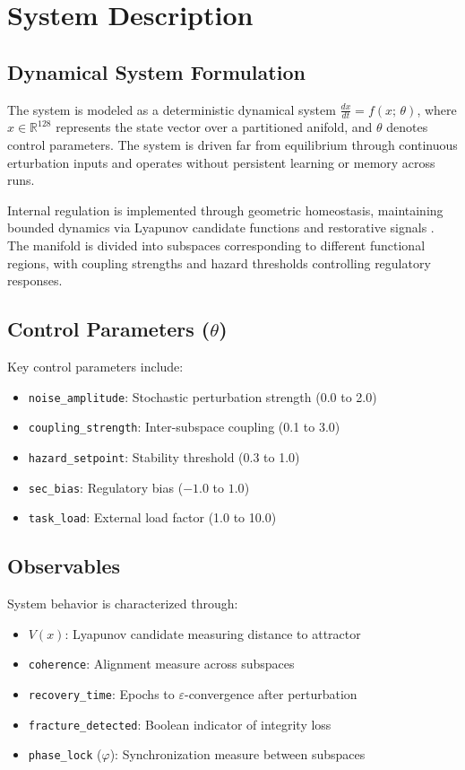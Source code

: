 \documentclass[12pt,a4paper]{article}
\begin{document}
\section{System Description}

\subsection{Dynamical System Formulation}

The system is modeled as a deterministic dynamical system $\frac{dx}{dt} = f(x;\,\theta)$, where $x \in \mathbb{R}^{128}$ represents the state vector over a partitioned anifold, and $\theta$ denotes control parameters. The system is driven far from equilibrium through continuous erturbation inputs and operates without persistent learning or memory across runs.


Internal regulation is implemented through geometric homeostasis, maintaining bounded dynamics via Lyapunov candidate functions and restorative signals \cite{khalil2002nonlinear}. The manifold is divided into subspaces corresponding to different functional regions, with coupling strengths and hazard thresholds controlling regulatory responses.

\subsection{Control Parameters ($\theta$)}

Key control parameters include:
\begin{itemize}
    \item \texttt{noise\_amplitude}: Stochastic perturbation strength (0.0 to 2.0)
    \item \texttt{coupling\_strength}: Inter-subspace coupling (0.1 to 3.0)
    \item \texttt{hazard\_setpoint}: Stability threshold (0.3 to 1.0)
    \item \texttt{sec\_bias}: Regulatory bias ($-1.0$ to $1.0$)
    \item \texttt{task\_load}: External load factor (1.0 to 10.0)
\end{itemize}

\subsection{Observables}

System behavior is characterized through:
\begin{itemize}
    \item $V(x)$: Lyapunov candidate measuring distance to attractor
    \item \texttt{coherence}: Alignment measure across subspaces
    \item \texttt{recovery\_time}: Epochs to $\varepsilon$-convergence after perturbation
    \item \texttt{fracture\_detected}: Boolean indicator of integrity loss
    \item \texttt{phase\_lock} ($\varphi$): Synchronization measure between subspaces
\end{itemize}
\end{document}
